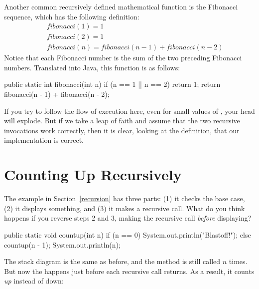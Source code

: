 \label{fibonacci}


Another common recursively defined mathematical function is the Fibonacci sequence, which has the following definition:
%
\begin{eqnarray*}
&& fibonacci(1) = 1 \\
&& fibonacci(2) = 1 \\
&& fibonacci(n) = fibonacci(n-1) + fibonacci(n-2)
\end{eqnarray*}
%
Notice that each Fibonacci number is the sum of the two preceding Fibonacci numbers.
Translated into Java, this function is as follows:

\begin{code}
public static int fibonacci(int n) {
    if (n == 1 || n == 2) {
        return 1;
    }
    return fibonacci(n - 1) + fibonacci(n - 2);
}
\end{code}

If you try to follow the flow of execution here, even for small values of , your head will explode.
But if we take a leap of faith and assume that the two recursive invocations work correctly, then it is clear, looking at the definition, that our implementation is correct.


\section{Counting Up Recursively}
\label{countup}

The  example in Section~\ref{recursion} has three parts: (1) it checks the base case, (2) it displays something, and (3) it makes a recursive call.
What do you think happens if you reverse steps 2 and 3, making the recursive call {\em before} displaying?

\begin{code}
public static void countup(int n) {
    if (n == 0) {
        System.out.println("Blastoff!");
    } else {
        countup(n - 1);
        System.out.println(n);
    }
}
\end{code}

The stack diagram is the same as before, and the method is still called $n$ times.
But now the  happens just before each recursive call returns.
As a result, it counts {\em up} instead of down:

